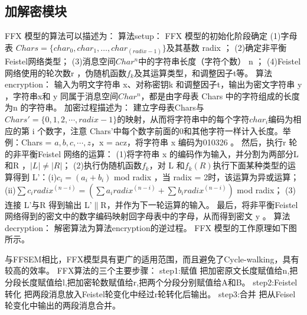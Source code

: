 \subsection{加解密模块} 
FFX 模型的算法可以描述为：\newline
算法setup：\newline 
FFX 模型的初始化阶段确定\newline 
(1)字母表 $Chars=\{char_0, char_1,…, char_{(radix-1)}\}$及其基数 radix ；\newline 
(2)确定非平衡Feistel网络类型；\newline 
(3)消息空间$Char^n$中的字符串长度（字符个数） n ；\newline 
(4)Feistel网络使用的轮次数r ，伪随机函数$f_k$及其运算类型，和调整因子t等。\newline
算法encryption：\newline 
输入为明文字符串 x、对称密钥k 和调整因子t，输出为密文字符串 y ，字符串x和 y 同属于消息空间$Char^n$，都是由字母表 Chars 中的字符组成的长度为n 的字符串。\newline
加密过程描述为：\newline 
建立字母表Chars与 $Chars' = \{0,1,2,\cdots ,radix-1\}$的映射，从而将字符串中的每个字符$char_i$编码为相应的第 i 个数字，注意 Chars'中每个数字前面的0和其他字符一样计入长度。举例：Chars = ${a,b,c,\cdots,z}$，x = acz，将字符串 x 编码为010326 。\newline 
然后，执行r 轮的非平衡Feistel 网络的运算：\newline
(1)将字符串 x 的编码作为输入，并分割为两部分L和R ，$|L|\neq|R|$；\newline
(2)执行伪随机函数$f_k$，对 L 和$f_k (R)$执行下面某种类型的运算得到 L'：(i)$c_i =( a_i + b_i)$  mod  radix ，当 radix = 2时，该运算为异或运算；(ii)$\sum c_i radix^(n-i) =( \sum a_i radix^{(n-i)} +\sum b_i radix^{(n-i)})$ mod  radix；\newline
(3)连接 L'与R 得到输出 L'$\parallel$R，并作为下一轮运算的输入。\newline 
最后，将非平衡Feistel 网络得到的密文中的数字编码映射回字母表中的字母，从而得到密文 y 。\newline
算法decryption：\newline 
解密算法为算法encryption的逆过程。 FFX 模型的工作原理如下图所示。


与FFSEM相比，FFX模型具有更广的适用范围，而且避免了Cycle-walking，具有较高的效率。\newline
FFX算法的三个主要步骤：\newline
step1:赋值\newline
把加密原文长度赋值给n,把分段长度赋值给l,把加密轮数赋值给r,把两个分段分别赋值给A和B。\newline
step2:Feistel转化\newline
把两段消息放入Feistel轮变化中经过r轮转化后输出。\newline
step3:合并\newline
把从Feisel轮变化中输出的两段消息合并。


